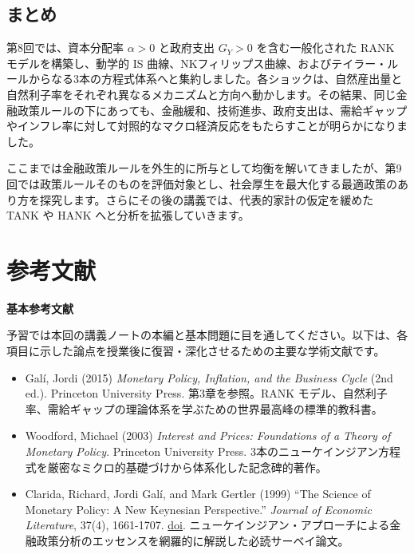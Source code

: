 \documentclass[
  japanese,
  lualatex,
  ja=standard,
  12pt,
  a4paper]{ltjsarticle}
\providecommand{\tightlist}{%
  \setlength{\itemsep}{0pt}\setlength{\parskip}{0pt}}
\begin{document}
\subsection{まとめ}\label{ux307eux3068ux3081-1}

第8回では、資本分配率 \(\alpha>0\) と政府支出 \(G_Y>0\)
を含む一般化された RANK モデルを構築し、動学的 IS
曲線、NKフィリップス曲線、およびテイラー・ルールからなる3本の方程式体系へと集約しました。各ショックは、自然産出量と自然利子率をそれぞれ異なるメカニズムと方向へ動かします。その結果、同じ金融政策ルールの下にあっても、金融緩和、技術進歩、政府支出は、需給ギャップやインフレ率に対して対照的なマクロ経済反応をもたらすことが明らかになりました。

ここまでは金融政策ルールを外生的に所与として均衡を解いてきましたが、第9回では政策ルールそのものを評価対象とし、社会厚生を最大化する最適政策のあり方を探究します。さらにその後の講義では、代表的家計の仮定を緩めた
TANK や HANK へと分析を拡張していきます。

\Needspace{0.36\textheight}

\section{参考文献}\label{ux53c2ux8003ux6587ux732e}

\textbf{基本参考文献}

予習では本回の講義ノートの本編と基本問題に目を通してください。以下は、各項目に示した論点を授業後に復習・深化させるための主要な学術文献です。

\begin{itemize}
\tightlist
\item
  Galí, Jordi (2015) \emph{Monetary Policy, Inflation, and the Business
  Cycle} (2nd ed.). Princeton University Press. 第3章を参照。RANK
  モデル、自然利子率、需給ギャップの理論体系を学ぶための世界最高峰の標準的教科書。
\item
  Woodford, Michael (2003) \emph{Interest and Prices: Foundations of a
  Theory of Monetary Policy}. Princeton University Press.
  3本のニューケインジアン方程式を厳密なミクロ的基礎づけから体系化した記念碑的著作。
\item
  Clarida, Richard, Jordi Galí, and Mark Gertler (1999) ``The Science of
  Monetary Policy: A New Keynesian Perspective.'' \emph{Journal of
  Economic Literature}, 37(4), 1661-1707.
  \href{https://doi.org/10.1257/jel.37.4.1661}{doi}.
  ニューケインジアン・アプローチによる金融政策分析のエッセンスを網羅的に解説した必読サーベイ論文。
\end{itemize}
\end{document}
